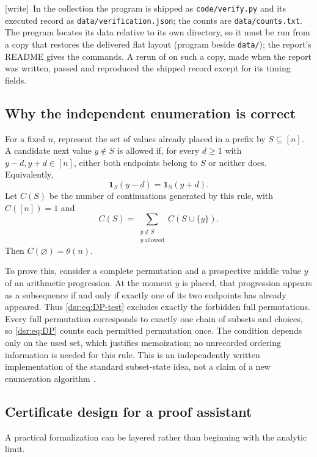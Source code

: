 \documentclass[11pt,a4paper]{article}
\numberwithin{equation}{section}
\theoremstyle{definition}
\theoremstyle{remark}
\newcommand{\code}[1]{\texttt{\detokenize{#1}}}
\newcommand{\wtag}{\textup{[write]}}
\newcommand{\lean}[1]{\nolinkurl{#1}}
\theoremstyle{definition}
\theoremstyle{plain}
\begin{document}
\wtag\ In the collection the program is shipped as \lean{code/verify.py} and
its executed record as \lean{data/verification.json}; the counts are
\lean{data/counts.txt}. The program locates its data relative to its own
directory, so it must be run from a copy that restores the delivered flat
layout (program beside \lean{data/}); the report's README gives the
commands. A rerun of \code{verify.py --max-n 32} on such a copy, made when
the report was written, passed and reproduced the shipped record except for
its timing fields.

\subsection{Why the independent enumeration is correct}
For a fixed $n$, represent the set of values already placed in a prefix by
$S\subseteq[n]$. A candidate next value $y\notin S$ is allowed if, for every
$d\ge1$ with $y-d,y+d\in[n]$, either both endpoints belong to $S$ or neither
does. Equivalently,
\begin{equation}
 \mathbf1_S(y-d)=\mathbf1_S(y+d).
\label{dsr:eq:DP-test}
\end{equation}
Let $C(S)$ be the number of continuations generated by this rule, with
$C([n])=1$ and
\begin{equation}
 C(S)=\sum_{\substack{y\notin S\\y\ \mathrm{allowed}}}C(S\cup\{y\}).
\label{dsr:eq:DP}
\end{equation}
Then $C(\varnothing)=\theta(n)$.

To prove this, consider a complete permutation and a prospective middle
value $y$ of an arithmetic progression. At the moment $y$ is placed, that
progression appears as a subsequence if and only if exactly one of its two
endpoints has already appeared. Thus \eqref{dsr:eq:DP-test} excludes exactly the
forbidden full permutations. Every full permutation corresponds to exactly
one chain of subsets and choices, so \eqref{dsr:eq:DP} counts each permitted
permutation once. The condition depends only on the used set, which justifies
memoization; no unrecorded ordering information is needed for this rule.
This is an independently written implementation of the standard subset-state
idea, not a claim of a new enumeration algorithm \cite{CorrellHo}.

\subsection{Certificate design for a proof assistant}
A practical formalization can be layered rather than beginning with the
analytic limit.
\end{document}
